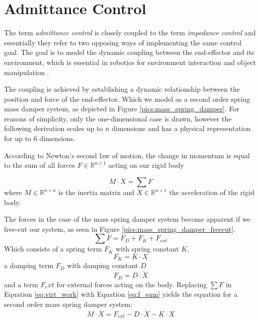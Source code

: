 \chapter{Admittance Control}
	\label{sec:adm_ctrl}
	
The term \emph{admittance control} is closely coupled to the term \emph{impedance control} and essentially they refer to two opposing ways of implementing the same control goal. The goal is to model the dynamic coupling between the end-effector and its environment, which is essential in robotics for environment interaction and object manipulation \citep{hogan1985impedance}.

The coupling is achieved by establishing a dynamic relationship between the position and force of the end-effector. Which we model as a second order spring mass damper system, as depicted in Figure \ref{pics:mass_spring_damper}. For reasons of simplicity, only the one-dimensional case is drawn, however the following derivation scales up to $n$ dimensions and has a physical representation for up to $6$ dimensions.

According to Newton's second law of motion, the change in momentum is equal to the sum of all forces $F \in \mathbb{R}^{n \times 1}$ acting on our rigid body

\begin{equation}
M \cdot \ddot{X} = \sum F
	\label{eq:virt_work}
\end{equation}
where $M \in \mathbb{R}^{n \times n}$ is the inertia matrix and $\ddot{X} \in \mathbb{R}^{n \times 1}$ the acceleration of the rigid body.

The forces in the case of the mass spring damper system become apparent if we free-cut our system, as  seen in Figure \ref{pics:mass_spring_damper_freecut}.
\begin{equation}
\sum F = F_D + F_K + F_{ext}
	\label{eq:f_sum}
\end{equation}
Which consists of a spring term $F_K$ with spring constant $K$,
\begin{equation}
F_K = K \cdot X
\end{equation}
 a damping term $F_D$ with damping constant $D$
\begin{equation}
F_D = D \cdot \dot{X}
\end{equation}
 and a term $F_ext$ for external forces acting on the body. Replacing $\sum F$ in Equation \ref{eq:virt_work} with Equation \ref{eq:f_sum} yields the equation for a second order mass spring damper system:
\begin{equation}
M \cdot \ddot{X} = F_{ext} -D \cdot \dot{X} -K \cdot X
	\label{eq:mass_spring_damper_sys}
\end{equation}

